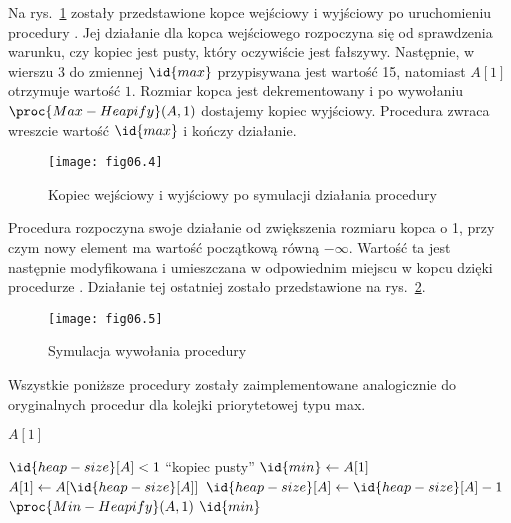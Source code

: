 \exercise %


\exercise %
Na rys.~\ref{fig:6.5-1} zostały przedstawione kopce wejściowy i wyjściowy po uruchomieniu procedury . Jej działanie dla kopca wejściowego rozpoczyna się od sprawdzenia warunku, czy kopiec jest pusty, który oczywiście jest fałszywy. Następnie, w wierszu 3 do zmiennej $\id{max}$ przypisywana jest wartość 15, natomiast $A[1]$ otrzymuje wartość $1$. Rozmiar kopca jest dekrementowany i po wywołaniu $\proc{Max-Heapify}(A,1)$ dostajemy kopiec wyjściowy. Procedura zwraca wreszcie wartość $\id{max}$ i kończy działanie.
\begin{figure}[!h]
	\begin{center}
		\texttt{[image: fig06.4]}
	\end{center}
	\caption{Kopiec wejściowy i wyjściowy po symulacji działania procedury } \label{fig:6.5-1}
\end{figure}

\exercise %
Procedura  rozpoczyna swoje działanie od zwiększenia rozmiaru kopca o 1, przy czym nowy element ma wartość początkową równą $-\infty$. Wartość ta jest następnie modyfikowana i umieszczana w odpowiednim miejscu w kopcu dzięki procedurze . Działanie tej ostatniej zostało przedstawione na rys.~\ref{fig:6.5-2}.
\begin{figure}[!h]
	\begin{center}
		\texttt{[image: fig06.5]}
	\end{center}
	\caption{Symulacja wywołania procedury } \label{fig:6.5-2}
\end{figure}

\exercise %
Wszystkie poniższe procedury zostały zaimplementowane analogicznie do oryginalnych procedur dla kolejki priorytetowej typu max.
\begin{codebox}
\li	\Return $A[1]$
\end{codebox}

\begin{codebox}
\li	\If $\id{heap-size}[A]<1$
\li		\Then \Error ``kopiec pusty''
		\End
\li	$\id{min}\gets A[1]$
\li	$A[1]\gets A[\id{heap-size}[A]]$
\li	$\id{heap-size}[A]\gets\id{heap-size}[A]-1$
\li	$\proc{Min-Heapify}(A,1)$
\li	\Return $\id{min}$
\end{codebox}

